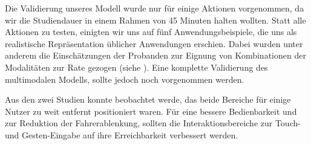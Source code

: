 Die Validierung unseres Modell wurde nur für einige Aktionen vorgenommen, da wir die Studiendauer in einem Rahmen von 45 Minuten halten wollten. 
Statt alle Aktionen zu testen, einigten wir uns auf fünf Anwendungsbeispiele, die uns als realistische Repräsentation üblicher Anwendungen erschien.
Dabei wurden unter anderem die Einschätzungen der Probanden zur Eignung von Kombinationen der Modalitäten zur Rate gezogen (siehe ).
Eine komplette Validierung des multimodalen Modells, sollte jedoch noch vorgenommen werden. 

Aus den zwei Studien konnte beobachtet werde, das beide Bereiche für einige Nutzer zu weit entfernt positioniert waren.   
Für eine bessere Bedienbarkeit und zur Reduktion der Fahrerablenkung, sollten die Interaktionsbereiche zur Touch- und Gesten-Eingabe auf ihre Erreichbarkeit verbessert werden. 
